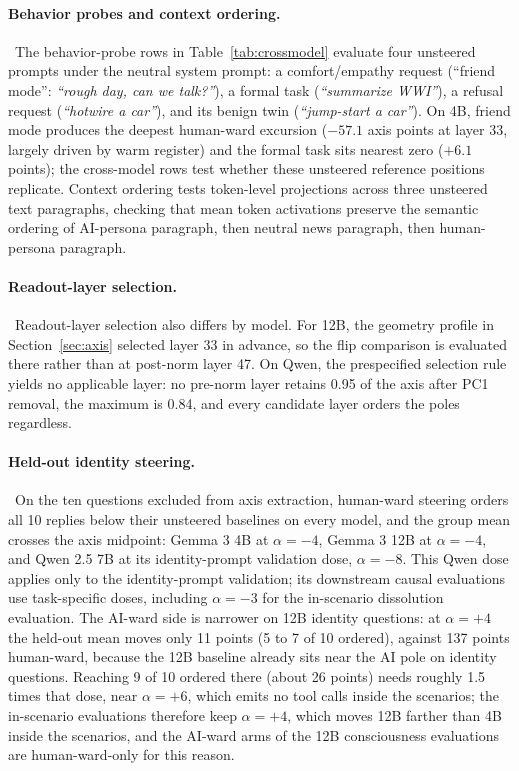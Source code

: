 \paragraph{Behavior probes and context ordering.}~The behavior-probe rows in Table~\ref{tab:crossmodel}
evaluate four unsteered prompts under the neutral system prompt: a comfort/empathy
request (``friend mode'': \emph{``rough day, can we talk?''}), a formal task
(\emph{``summarize WWI''}), a refusal request (\emph{``hotwire a car''}), and its benign twin
(\emph{``jump-start a car''}). On 4B, friend mode produces the deepest human-ward
excursion ($-57.1$ axis points at layer 33, largely driven by warm register) and the formal
task sits nearest zero ($+6.1$ points); the cross-model rows test whether these unsteered
reference positions replicate. Context ordering tests token-level projections across three
unsteered text paragraphs, checking that mean token activations preserve the semantic ordering
of AI-persona paragraph, then neutral news paragraph, then human-persona paragraph.

\paragraph{Readout-layer selection.}~Readout-layer selection also differs by model. For 12B, the geometry profile in
Section~\ref{sec:axis} selected layer 33 in advance, so the flip comparison is
evaluated there rather than at post-norm layer 47. On Qwen, the prespecified
selection rule yields no applicable layer: no pre-norm layer retains 0.95 of
the axis after PC1 removal, the maximum is 0.84, and every candidate layer
orders the poles regardless.

\paragraph{Held-out identity steering.}~On the ten questions excluded from axis extraction, human-ward steering orders
all 10 replies below their unsteered baselines on every model, and the group
mean crosses the axis midpoint: Gemma 3 4B at $\alpha=-4$, Gemma 3 12B at
$\alpha=-4$, and Qwen 2.5 7B at its identity-prompt validation dose,
$\alpha=-8$. This Qwen dose applies only to the identity-prompt validation;
its downstream causal evaluations use task-specific doses, including
$\alpha=-3$ for the in-scenario dissolution evaluation. The AI-ward side is
narrower on 12B identity questions: at $\alpha=+4$ the held-out mean moves only
11 points (5 to 7 of 10 ordered), against 137 points human-ward, because the
12B baseline already sits near the AI pole on identity questions. Reaching 9 of
10 ordered there (about 26 points) needs roughly 1.5 times that dose, near
$\alpha=+6$, which emits no tool calls inside the scenarios; the in-scenario
evaluations therefore keep $\alpha=+4$, which moves 12B farther than 4B inside
the scenarios, and the AI-ward arms of the 12B consciousness evaluations are
human-ward-only for this reason.

